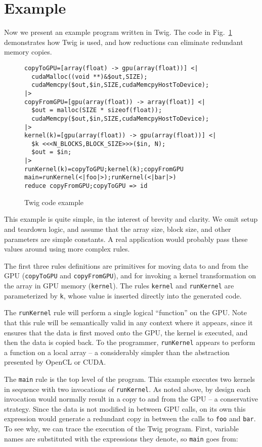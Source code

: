 
\section{Example}
\label{sec:example}

Now we present an example program written in Twig. The code in Fig.~\ref{fig:example-code} demonstrates how Twig is used, and how reductions can eliminate redundant memory copies.

\begin{figure}[ht]
\begin{verbatim}
copyToGPU=[array(float) -> gpu(array(float))] <|
  cudaMalloc((void **)&$out,SIZE);
  cudaMemcpy($out,$in,SIZE,cudaMemcpyHostToDevice);
|>
copyFromGPU=[gpu(array(float)) -> array(float)] <|
  $out = malloc(SIZE * sizeof(float));
  cudaMemcpy($out,$in,SIZE,cudaMemcpyHostToDevice);
|>
kernel(k)=[gpu(array(float)) -> gpu(array(float))] <|
  $k <<<N_BLOCKS,BLOCK_SIZE>>>($in, N);
  $out = $in;
|>
runKernel(k)=copyToGPU;kernel(k);copyFromGPU
main=runKernel(<|foo|>);runKernel(<|bar|>)
reduce copyFromGPU;copyToGPU => id
\end{verbatim}
\caption{Twig code example}
\label{fig:example-code}
\end{figure}

This example is quite simple, in the interest of brevity and clarity. We omit setup and teardown logic, and assume that the array size, block size, and other parameters are simple constants. A real application would probably pass these values around using more complex rules.

The first three rules definitions are primitives for moving data to and from the GPU (\texttt{copyToGPU} and \texttt{copyFromGPU}), and for invoking a kernel transformation on the array in GPU memory (\texttt{kernel}). The rules \texttt{kernel} and \texttt{runKernel} are parameterized by \texttt{k}, whose value is inserted directly into the generated code.

The \texttt{runKernel} rule will perform a single logical ``function'' on the GPU. Note that this rule will be semantically valid in any context where it appears, since it ensures that the data is first moved onto the GPU, the kernel is executed, and then the data is copied back. To the programmer, \texttt{runKernel} appears to perform a function on a local array -- a considerably simpler than the abstraction presented by OpenCL or CUDA.

The \texttt{main} rule is the top level of the program. This example executes two kernels in sequence with two invocations of \texttt{runKernel}. As noted above, by design each invocation would normally result in a copy to and from the GPU -- a conservative strategy. Since the data is not modified in between GPU calls, on its own this expression would generate a redundant copy in between the calls to \texttt{foo} and \texttt{bar}. To see why, we can trace the execution of the Twig program. First, variable names are substituted with the expressions they denote, so \texttt{main} goes from:

